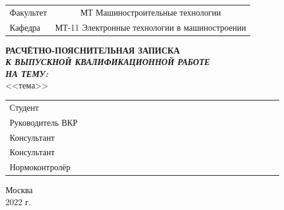 \documentclass[../template.tex]{subfiles}
\begin{document}
\begin{titlepage}
	
	\begin{center}
		\begin{tabular}{lc}
			Факультет & {МТ Машиностроительные технологии}\\
			\cline{2-2}
			Кафедра & {МТ-11 Электронные технологии в машиностроении}\\
			\cline{2-2}
		\end{tabular}
	\end{center}
		\vspace{2em}
		\begin{center}
			{\bfseries \Large РАСЧЁТНО-ПОЯСНИТЕЛЬНАЯ ЗАПИСКА}\\
			{\Large \itshape \bfseries К ВЫПУСКНОЙ КВАЛИФИКАЦИОННОЙ РАБОТЕ}\\
			{\itshape \bfseries \Large НА ТЕМУ:}\\
		{\Large <<тема>>}
		\end{center}
		\vspace{3em}

	\begin{flushleft}
	\begin{tabular}{p{0.25\linewidth}p{0.15\linewidth}p{0.25\linewidth}P{0.25\linewidth}}
		Студент & & & \\
		Руководитель ВКР & & & \\
		Консультант & & &\uname{\hfill} \\
		Консультант & & &\uname{\hfill} \\
		Нормоконтролёр & & & \\
		
	\end{tabular}
	\end{flushleft}

		\vspace{\fill}
		
		\begin{center}
			Москва \\2022 г.
		\end{center}
	\end{titlepage}
\end{document}
